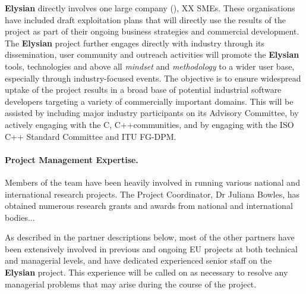 \documentclass[a4paper,11pt]{article}
\newcommand{\project}[1]{\textbf{#1}\xspace}
\newcommand{\SECURITY}{\project{Elysian}}
\newcommand{\TheProject}{\SECURITY}
\begin{document}
\TheProject{} directly involves one large company (\IBMshort{}), 
XX SMEs.
These organisations have included draft exploitation plans that will directly use the results of the project
as part of their ongoing business strategies and commercial development.
The \TheProject{} project further engages directly with industry through its
dissemination, user community and outreach activities 
will promote the
\TheProject{} tools, technologies and above all \emph{mindset} and \emph{methodology} to a wider user base,
especially through industry-focused events. %
The objective is to ensure widespread uptake of the project results in a broad base of potential industrial
software developers targeting a variety of commercially important domains. %
This will be assisted by including major industry participants on its Advisory Committee,
by actively engaging with the C, C++communities, and by engaging with the ISO C++ Standard Committee and ITU FG-DPM.


\paragraph{Project Management Expertise.}

Members of the team have been heavily involved in running
various national and international research projects.  The
Project Coordinator, Dr Juliana Bowles, has obtained numerous
research grants and awards from national and international
bodies...

As described in the partner descriptions below,
most of the other partners have been extensively involved in previous and
ongoing EU projects at both technical and managerial
levels, and have dedicated experienced senior staff on the \TheProject{} project.
%
This experience will be called on as necessary to resolve any
managerial problems that may arise during the course of the
project.
\end{document}
